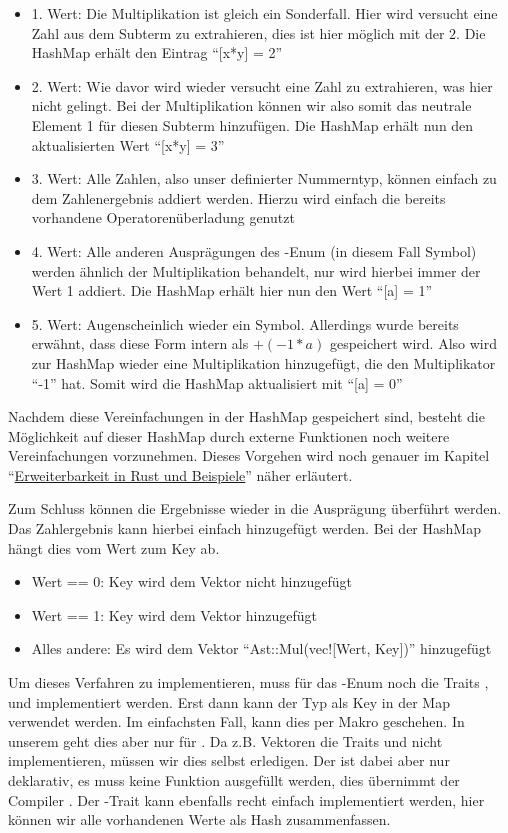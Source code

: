 \documentclass[11pt,a4paper, ngerman]{article}
\begin{document}
\begin{itemize}
    \item 1. Wert: Die Multiplikation ist gleich ein Sonderfall. Hier wird versucht eine Zahl aus dem Subterm zu extrahieren, dies ist hier möglich mit der $2$. Die HashMap erhält den Eintrag ``[x*y] = 2''
    \item 2. Wert: Wie davor wird wieder versucht eine Zahl zu extrahieren, was hier nicht gelingt. Bei der Multiplikation können wir also somit das neutrale Element 1 für diesen Subterm hinzufügen. Die HashMap erhält nun den aktualisierten Wert ``[x*y] = 3''
    \item 3. Wert: Alle Zahlen, also unser definierter Nummerntyp, können einfach zu dem Zahlenergebnis addiert werden. Hierzu wird einfach die bereits vorhandene Operatorenüberladung genutzt
    \item 4. Wert: Alle anderen Ausprägungen des -Enum (in diesem Fall Symbol) werden ähnlich der Multiplikation behandelt, nur wird hierbei immer der Wert 1 addiert. Die HashMap erhält hier nun den Wert ``[a] = 1''
    \item 5. Wert: Augenscheinlich wieder ein Symbol. Allerdings wurde bereits erwähnt, dass diese Form intern als $+(-1*a)$ gespeichert wird. Also wird zur HashMap wieder eine Multiplikation hinzugefügt, die den Multiplikator ``-1'' hat. Somit wird die HashMap aktualisiert mit ``[a] = 0''
\end{itemize}

Nachdem diese Vereinfachungen in der HashMap gespeichert sind, besteht die Möglichkeit auf dieser HashMap durch externe Funktionen noch weitere Vereinfachungen vorzunehmen. Dieses Vorgehen wird noch genauer im Kapitel ``\hyperref[sec:kapErRustUndBei]{Erweiterbarkeit in Rust und Beispiele}'' näher erläutert.

Zum Schluss können die Ergebnisse wieder in die Ausprägung  überführt werden. Das Zahlergebnis kann hierbei einfach hinzugefügt werden. Bei der HashMap hängt dies vom Wert zum Key ab. 

\begin{itemize}
    \item Wert == 0: Key wird dem Vektor nicht hinzugefügt
    \item Wert == 1: Key wird dem Vektor hinzugefügt
    \item Alles andere: Es wird dem Vektor ``Ast::Mul(vec![Wert, Key])'' hinzugefügt
\end{itemize}

Um dieses Verfahren zu implementieren, muss für das -Enum noch die Traits ,  und  implementiert werden. Erst dann kann der Typ  als Key in der Map verwendet werden. Im einfachsten Fall, kann dies per Makro geschehen. In unserem geht dies aber nur für . Da z.B. Vektoren die Traits  und  nicht implementieren, müssen wir dies selbst erledigen. Der  ist dabei aber nur deklarativ, es muss keine Funktion ausgefüllt werden, dies übernimmt der Compiler \cite{RustEqTrait}. Der -Trait kann ebenfalls recht einfach implementiert werden, hier können wir alle vorhandenen Werte als Hash zusammenfassen.
\end{document}
